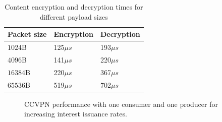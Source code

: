 \begin{table}[!h]
\centering
\caption{Content encryption and decryption times for different payload sizes}
\label{my-label}
\begin{tabular}{|l|l|l|}
\hline
Packet size        & Encryption & Decryption \\ \hline
$1024$B & 125$\mu s$        & 193$\mu s$        \\ \hline
$4096$B & 141$\mu s$        & 220$\mu s$        \\ \hline
$16384$B & 220$\mu s$        & 367$\mu s$        \\ \hline
$65536$B & 519$\mu s$        & 702$\mu s$        \\ \hline
\end{tabular}
\end{table}

\begin{figure}[]
\centering
  \hfil
\caption{CCVPN performance with one consumer and one producer for increasing interest issuance rates.}\label{exp1}
\end{figure}

